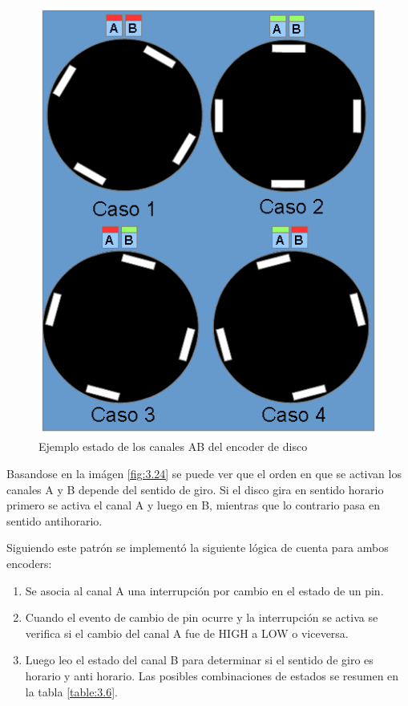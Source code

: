 \begin{figure}[!ht]
	\centering
	\includegraphics[width=15cm,scale=1]{resources/3_24-encoderDiscoAB.png}
	\caption{Ejemplo estado de los canales AB del encoder de disco}
	\label{fig:\thefigure}
\end{figure}

Basandose en la imágen \ref{fig:3.24} se puede ver que el orden en que se activan los canales A y B depende del sentido de giro. Si el disco gira en sentido horario primero se activa el canal A y luego en B, mientras que lo contrario pasa en sentido antihorario.

Siguiendo este patrón se implementó la siguiente lógica de cuenta para ambos encoders:
\begin{enumerate}
	\item Se asocia al canal A una interrupción por cambio en el estado de un pin.
	\item Cuando el evento de cambio de pin ocurre y la interrupción se activa se verifica si el cambio del canal A fue de HIGH a LOW o viceversa. 
	\item Luego leo el estado del canal B para determinar si el sentido de giro es horario y anti horario. Las posibles combinaciones de estados se resumen en la tabla \ref{table:3.6}.
\end{enumerate}

